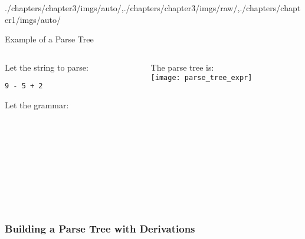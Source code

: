 \begin{graphicspathcontext}{{./chapters/chapter3/imgs/auto/},{./chapters/chapter3/imgs/raw/},{./chapters/chapter1/imgs/auto/}}
\begin{bibunit}[apalike]
\begin{frame}{Example of a Parse Tree}
	\begin{columns}
		\begin{column}[t]{.5\linewidth}
			Let the string to parse:
				\begin{center}\texttt{9 - 5 + 2}\end{center}
			Let the grammar:\\[1em]
			\begin{scriptsize}
			\begin{bnf}
				 \\
				 \\
				 \\
				 \\
				 \\
				 \\
				 \\
			\end{bnf}
			\end{scriptsize}
		\end{column}
		\begin{column}[t]{.5\linewidth}
			The parse tree is:\\[1em]
			\texttt{[image: parse\_tree\_expr]}
		\end{column}			
	\end{columns}
\end{frame}

\subsubsection{Building a Parse Tree with Derivations}
\subsubsectiontableofcontentslide


\end{bibunit}
\end{graphicspathcontext}
